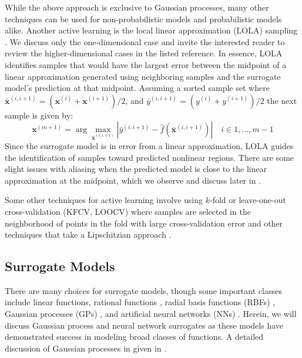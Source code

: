 \documentclass[conference]{IEEEtran}
\begin{document}
    While the above approach is exclusive to Gaussian processes, many other techniques can be used for non-probabilistic models and probabilistic models alike. Another active learning is the local linear approximation (LOLA) sampling \cite{article}. We discuss only the one-dimensional case and invite the interested reader to review the higher-dimensional cases in the listed reference. In essence, LOLA identifies samples that would have the largest error between the midpoint of a linear approximation generated using neighboring samples and the surrogate model's prediction at that midpoint. Assuming a sorted sample set where $\boldsymbol{\bar{x}}^{(i,i+1)} = (\boldsymbol{x}^{(i)} + \boldsymbol{x}^{(i+1)}) / 2$, and $\bar{y}^{(i,i+1)} = (y^{(i)} + y^{(i+1)})/2$ the next sample is given by:
    \begin{equation}
         \boldsymbol{x}^{(m+1)} = \arg \max_{\boldsymbol{\bar{x}}^{(i,i+1)}} \left| \bar{y}^{(i,i+1)} - \hat{f}\left(\boldsymbol{\bar{x}}^{(i,i+1)}\right) \right| \quad i \in {1, ..., m-1}
    \end{equation}
    Since the surrogate model is in error from a linear approximation, LOLA guides the identification of samples toward predicted nonlinear regions. There are some slight issues with aliasing when the predicted model is close to the linear approximation at the midpoint, which we observe and discuss later in .
    
    Some other techniques for active learning involve using $k$-fold or leave-one-out cross-validation (KFCV, LOOCV) where samples are selected in the neighborhood of points in the fold with large cross-validation error \cite{Kaminsky2018AdaptiveSurfaces} and other techniques that take a Lipschitzian approach \cite{Lovison2010AdaptiveMetamodeling}.

    \subsection{Surrogate Models}
    
    There are many choices for surrogate models, though some important classes include linear functions, rational functions \cite{Hendrickx2005SequentialMetamodelling}, radial basis functions (RBFs) \cite{Mackman2010InvestigationFunctions}, Gaussian processes (GPs) \cite{Simpson2001SamplingAnalysis,VanBeers2005KrigingOverview}, and artificial neural networks (NNs) \cite{Eason2014AdaptiveNetworks}. Herein, we will discuss Gaussian process and neural network surrogates as these models have demonstrated success in modeling broad classes of functions. A detailed discussion of Gaussian processes in given in \cite{williams2006gaussian}.
	
\end{document}
